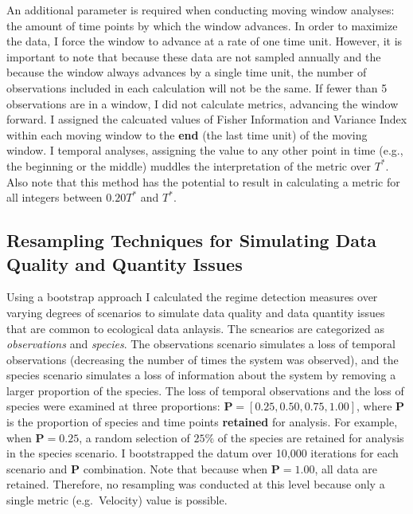 \documentclass[12pt,twoside,openany]{reedthesis}
\begin{document}
An additional parameter is required when conducting moving window analyses: the amount of time points by which the window advances. In order to maximize the data, I force the window to advance at a rate of one time unit. However, it is important to note that because these data are not sampled annually and the because the window always advances by a single time unit, the number of observations included in each calculation will not be the same. If fewer than 5 observations are in a window, I did not calculate metrics, advancing the window forward.
I assigned the calcuated values of Fisher Information and Variance Index within each moving window to the \textbf{end} (the last time unit) of the moving window. I temporal analyses, assigning the value to any other point in time (e.g., the beginning or the middle) muddles the interpretation of the metric over \(T^*\). Also note that this method has the potential to result in calculating a metric for all integers between \(0.20 T^*\) and \(T^*\).

\hypertarget{resampling-techniques-for-simulating-data-quality-and-quantity-issues}{%
\subsection{Resampling Techniques for Simulating Data Quality and Quantity Issues}\label{resampling-techniques-for-simulating-data-quality-and-quantity-issues}}

Using a bootstrap approach I calculated the regime detection measures over varying degrees of scenarios to simulate data quality and data quantity issues that are common to ecological data anlaysis. The scnearios are categorized as \emph{observations} and \emph{species}. The observations scenario simulates a loss of temporal observations (decreasing the number of times the system was observed), and the species scenario simulates a loss of information about the system by removing a larger proportion of the species. The loss of temporal observations and the loss of species were examined at three proportions: \(\textbf{P} = [0.25, 0.50, 0.75, 1.00]\), where \(\textbf{P}\) is the proportion of species and time points \textbf{retained} for analysis. For example, when \(\textbf{P} = 0.25\), a random selection of \(25\%\) of the species are retained for analysis in the species scenario. I bootstrapped the datum over 10,000 iterations for each scenario and \(\textbf{P}\) combination. Note that because when \(\textbf{P} = 1.00\), all data are retained. Therefore, no resampling was conducted at this level because only a single metric (e.g.~Velocity) value is possible.
\end{document}
